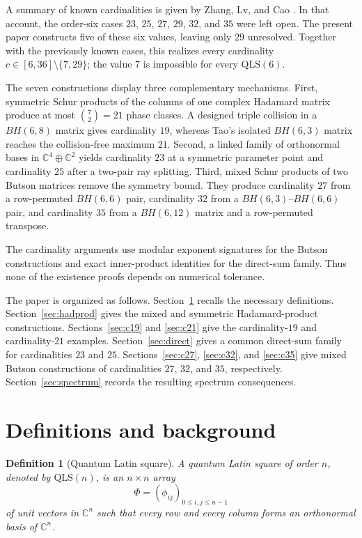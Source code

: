 \documentclass[11pt,a4paper]{article}
\newcommand{\C}{\mathbb{C}}
\newcommand{\QLS}{\mathrm{QLS}}
\newtheorem{definition}{Definition}
\begin{document}
A summary of known cardinalities is given by Zhang, Lv, and Cao
\cite[Table~6]{ZhangLvCao2026}.  In that account, the order-six cases
$23$, $25$, $27$, $29$, $32$, and $35$ were left open.  The present paper
constructs five of these six values, leaving only $29$ unresolved.  Together
with the previously known cases, this realizes every cardinality
$c\in[6,36]\setminus\{7,29\}$; the value $7$ is impossible for every
$\QLS(6)$.

The seven constructions display three complementary mechanisms.  First,
symmetric Schur products of the columns of one complex Hadamard matrix
produce at most $\binom72=21$ phase classes.  A designed triple collision in a
$BH(6,8)$ matrix gives cardinality $19$, whereas Tao's isolated $BH(6,3)$
matrix reaches the collision-free maximum $21$.  Second, a linked family of
orthonormal bases in $\C^4\oplus\C^2$ yields cardinality $23$ at a symmetric
parameter point and cardinality $25$ after a two-pair ray splitting.  Third,
mixed Schur products of two Butson matrices remove the symmetry bound.  They
produce cardinality $27$ from a row-permuted $BH(6,6)$ pair, cardinality $32$
from a $BH(6,3)$--$BH(6,6)$ pair, and cardinality $35$ from a $BH(6,12)$
matrix and a row-permuted transpose.

The cardinality arguments use modular exponent signatures for the Butson
constructions and exact inner-product identities for the direct-sum family.
Thus none of the existence proofs depends on numerical tolerance.

The paper is organized as follows.  Section~\ref{sec:prelim} recalls the
necessary definitions.  Section~\ref{sec:hadprod} gives the mixed and symmetric
Hadamard-product constructions.  Sections~\ref{sec:c19} and \ref{sec:c21}
give the cardinality-$19$ and cardinality-$21$ examples.  Section~\ref{sec:direct}
gives a common direct-sum family for cardinalities $23$ and $25$.
Sections~\ref{sec:c27}, \ref{sec:c32}, and \ref{sec:c35} give mixed Butson
constructions of cardinalities $27$, $32$, and $35$, respectively.
Section~\ref{sec:spectrum} records the resulting spectrum consequences.

\section{Definitions and background}\label{sec:prelim}

\begin{definition}[Quantum Latin square]
A quantum Latin square of order $n$, denoted by $\QLS(n)$, is an $n\times n$
array
\[
  \Phi=(\phi_{ij})_{0\leq i,j\leq n-1}
\]
of unit vectors in $\C^n$ such that every row and every column forms an
orthonormal basis of $\C^n$.
\end{definition}
\end{document}
